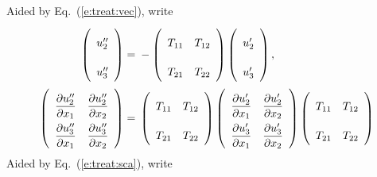 \documentclass[a4paper,12pt,dvips]{article}
\begin{document}
Aided by Eq.~(\ref{e:treat:vec}), write
\begin{align*}
  \left(\begin{array}{c}
    u''_2 \\ u''_3
  \end{array}\right)
  = &\;
 -\left(\begin{array}{ccc}
    T_{11} & T_{12} \\
    T_{21} & T_{22}
  \end{array}\right)
  \left(\begin{array}{c}
    u'_2 \\ u'_3
  \end{array}\right),
  \\
  \renewcommand{\arraystretch}{2.2}
  \left(\begin{array}{ccc}
    \dfrac{\partial u''_2}{\partial x_1} &
    \dfrac{\partial u''_2}{\partial x_2} \\
    \dfrac{\partial u''_3}{\partial x_1} &
    \dfrac{\partial u''_3}{\partial x_2}
  \end{array}\right)
  = &\;
  \renewcommand{\arraystretch}{2.2}
  \left(\begin{array}{ccc}
    T_{11} & T_{12} \\
    T_{21} & T_{22}
  \end{array}\right)
  \left(\begin{array}{ccc}
    \dfrac{\partial u'_2}{\partial x_1} &
    \dfrac{\partial u'_2}{\partial x_2} \\
    \dfrac{\partial u'_3}{\partial x_1} &
    \dfrac{\partial u'_3}{\partial x_2}
  \end{array}\right)
  \left(\begin{array}{ccc}
    T_{11} & T_{12} \\
    T_{21} & T_{22}
  \end{array}\right)
\end{align*}
%
Aided by Eq.~(\ref{e:treat:sca}), write
\end{document}
